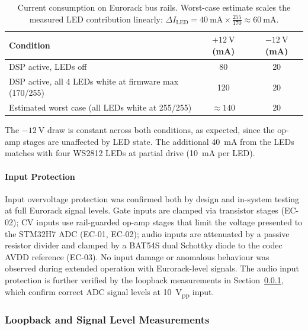 \begin{table}[H]
    \centering
    \begin{tabular}{lcc}
        \toprule
        \textbf{Condition} & \textbf{$+\SI{12}{\volt}$ (mA)} & \textbf{$-\SI{12}{\volt}$ (mA)} \\
        \midrule
        DSP active, LEDs off                                   & 80  & 20 \\
        DSP active, all 4 LEDs white at firmware max (170/255) & 120 & 20 \\
        Estimated worst case (all LEDs white at 255/255)       & $\approx 140$ & 20 \\
        \bottomrule
    \end{tabular}
    \caption{Current consumption on Eurorack bus rails. Worst-case estimate scales the measured LED contribution linearly: $\Delta I_\text{LED} = \SI{40}{\milli\ampere} \times \frac{255}{170} \approx \SI{60}{\milli\ampere}$.}
    \label{tab:power-consumption}
\end{table}

The $-\SI{12}{\volt}$ draw is constant across both conditions, as expected, since the op-amp stages are unaffected by LED state.
The additional \qty{40}{\milli\ampere} from the LEDs matches with four WS2812 LEDs at partial drive (\qty{10}{\milli\ampere} per LED).

\paragraph{Input Protection}

Input overvoltage protection was confirmed both by design and in-system testing at full Eurorack signal levels.
Gate inputs are clamped via transistor stages (EC-02); CV inputs use rail-guarded op-amp stages that limit the voltage presented to the STM32H7 ADC (EC-01, EC-02); audio inputs are attenuated by a passive resistor divider and clamped by a BAT54S dual Schottky diode to the codec AVDD reference (EC-03).
No input damage or anomalous behaviour was observed during extended operation with Eurorack-level signals.
The audio input protection is further verified by the loopback measurements in Section~\ref{sec:loopback-signal-level-measaurements}, which confirm correct ADC signal levels at \SI{10}{\volt_{pp}} input.

\subsubsection{Loopback and Signal Level Measurements}
\label{sec:loopback-signal-level-measaurements}

